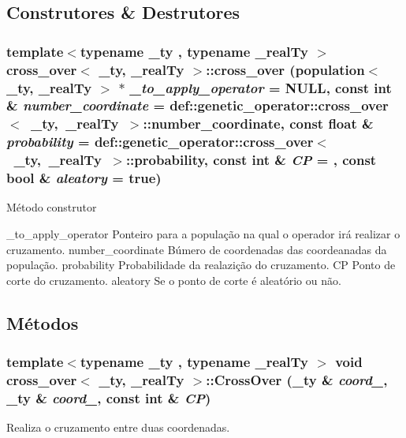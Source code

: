 \subsection{Construtores \& Destrutores}
\hypertarget{classcross__over_aa3561392e40e80aec88cc88aab4f988d}{
\subsubsection[{cross\_\-over}]{\setlength{\rightskip}{0pt plus 5cm}template$<$typename \_\-ty , typename \_\-realTy $>$ {\bf cross\_\-over}$<$ \_\-ty, \_\-realTy $>$::{\bf cross\_\-over} ({\bf population}$<$ \_\-ty, \_\-realTy $>$ $\ast$ {\em \_\-to\_\-apply\_\-operator} = {\ttfamily NULL}, \/  const int \& {\em number\_\-coordinate} = {\ttfamily def::genetic\_\-operator::cross\_\-over$<$~\_\-ty,~\_\-realTy~$>$::number\_\-coordinate}, \/  const float \& {\em probability} = {\ttfamily def::genetic\_\-operator::cross\_\-over$<$~\_\-ty,~\_\-realTy~$>$::probability}, \/  const int \& {\em CP} = {}, \/  const bool \& {\em aleatory} = {\ttfamily true})}}
\label{classcross__over_aa3561392e40e80aec88cc88aab4f988d}
Método construtor

\_\-to\_\-apply\_\-operator Ponteiro para a população na qual o operador irá realizar o cruzamento.  number\_\-coordinate Búmero de coordenadas das coordeanadas da população.  probability Probabilidade da realazição do cruzamento.  CP Ponto de corte do cruzamento.  aleatory Se o ponto de corte é aleatório ou não. 

\subsection{Métodos}
\hypertarget{classcross__over_af8d2e8a02552551f3edd692793816de3}{
\subsubsection[{CrossOver}]{\setlength{\rightskip}{0pt plus 5cm}template$<$typename \_\-ty , typename \_\-realTy $>$ void {\bf cross\_\-over}$<$ \_\-ty, \_\-realTy $>$::CrossOver (\_\-ty \& {\em coord\_}, \/  \_\-ty \& {\em coord\_}, \/  const int \& {\em CP})}}
\label{classcross__over_af8d2e8a02552551f3edd692793816de3}
Realiza o cruzamento entre duas coordenadas.

